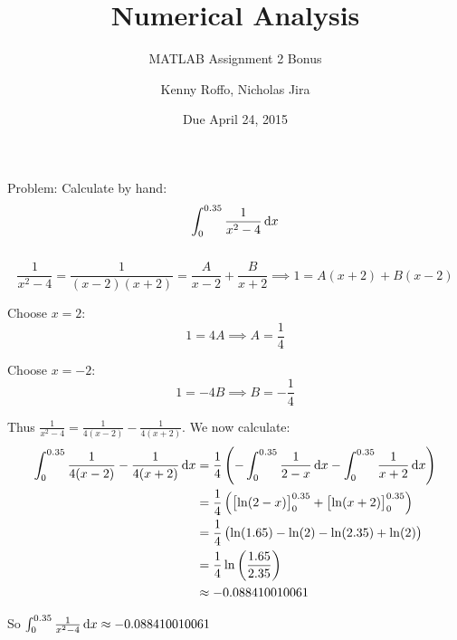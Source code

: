 \documentclass{scrartcl}
\title{Numerical Analysis}
\subtitle{MATLAB Assignment 2 Bonus}
\author{Kenny Roffo, Nicholas Jira}
\date{Due April 24, 2015}
\begin{document}
\maketitle

Problem: Calculate by hand: $$\int_0^{0.35}\frac{1}{x^2-4}\dif{x}$$\\

\begin{displaymath}
\frac{1}{x^2-4} = \frac{1}{(x-2)(x+2)} = \frac{A}{x-2} + \frac{B}{x+2} \implies 1=A(x+2)+B(x-2)
\end{displaymath}

Choose $x=2$:
\begin{displaymath}
1=4A \implies A=\frac{1}{4}
\end{displaymath}

Choose $x=-2$:
\begin{displaymath}
1=-4B \implies B=-\frac{1}{4}
\end{displaymath}

Thus $\frac{1}{x^2-4}=\frac{1}{4(x-2)}-\frac{1}{4(x+2)}$. We now calculate:
\begin{align*}
\int_0^{0.35}\frac{1}{4(x-2)}-\frac{1}{4(x+2)}\dif{x}
&= \frac{1}{4}\left(-\int_0^{0.35}\frac{1}{2-x}\dif{x}-\int_0^{0.35}\frac{1}{x+2}\dif{x}\right)\\
&= \frac{1}{4}\left(\left[\ln(2-x)\right]_0^{0.35}+\left[\ln(x+2)\right]_0^{0.35}\right)\\
&= \frac{1}{4}\left(\ln(1.65)-\ln(2)-\ln(2.35)+\ln(2)\right)\\
&= \frac{1}{4}\ln\left(\frac{1.65}{2.35}\right)\\
&\approx -0.088410010061
\end{align*}

So $\int_0^{0.35}\frac{1}{x^2-4}\dif{x} \approx -0.088410010061$
\end{document}
